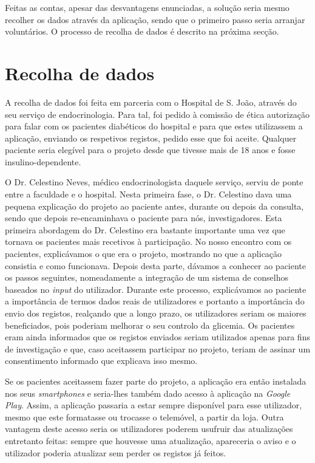 Feitas as contas, apesar das desvantagens enunciadas, a solução seria mesmo recolher os dados através da aplicação, sendo que o primeiro passo seria arranjar voluntários. O processo de recolha de dados é descrito na próxima secção.

\section{Recolha de dados}

A recolha de dados foi feita em parceria com o Hospital de S. João, através do seu serviço de endocrinologia. Para tal, foi pedido à comissão de ética autorização para falar com os pacientes diabéticos do hospital e para que estes utilizassem a aplicação, enviando os respetivos registos, pedido esse que foi aceite. Qualquer paciente seria elegível para o projeto desde que tivesse mais de 18 anos e fosse insulino-dependente. 

O Dr. Celestino Neves, médico endocrinologista daquele serviço, serviu de ponte entre a faculdade e o hospital. Nesta primeira fase, o Dr. Celestino dava uma pequena explicação do projeto ao paciente antes, durante ou depois da consulta, sendo que depois re-encaminhava o paciente para nós, investigadores. Esta primeira abordagem do Dr. Celestino era bastante importante uma vez que tornava os pacientes mais recetivos à participação. No nosso encontro com os pacientes, explicávamos o que era o projeto, mostrando no que a aplicação consistia e como funcionava. Depois desta parte, dávamos a conhecer ao paciente os passos seguintes, nomeadamente a integração de um sistema de conselhos baseados no \textit{input} do utilizador. Durante este processo, explicávamos ao paciente a importância de termos dados reais de utilizadores e portanto a importância do envio dos registos, realçando que a longo prazo, os utilizadores seriam os maiores beneficiados, pois poderiam melhorar o seu controlo da glicemia. Os pacientes eram ainda informados que os registos enviados seriam utilizados apenas para fins de investigação e que, caso aceitassem participar no projeto, teriam de assinar um consentimento informado que explicava isso mesmo.

Se os pacientes aceitassem fazer parte do projeto, a aplicação era então instalada nos seus \textit{smartphones} e seria-lhes também dado acesso à aplicação na \textit{Google Play}. Assim, a aplicação passaria a estar sempre disponível para esse utilizador, mesmo que este formatasse ou trocasse o telemóvel, a partir da loja. Outra vantagem deste acesso seria os utilizadores poderem usufruir das atualizações entretanto feitas: sempre que houvesse uma atualização, apareceria o aviso e o utilizador poderia atualizar sem perder os registos já feitos.


